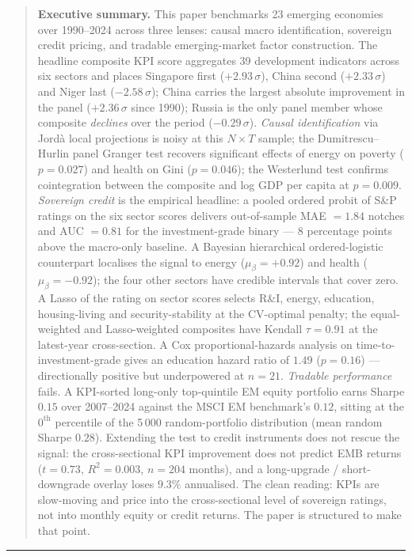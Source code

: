 \begin{quote}\small
\noindent\textbf{Executive summary.} This paper benchmarks 23 emerging economies over 1990--2024 across three lenses: causal macro identification, sovereign credit pricing, and tradable emerging-market factor construction. The headline composite KPI score aggregates 39 development indicators across six sectors and places Singapore first ($+2.93\,\sigma$), China second ($+2.33\,\sigma$) and Niger last ($-2.58\,\sigma$); China carries the largest absolute improvement in the panel ($+2.36\,\sigma$ since 1990); Russia is the only panel member whose composite \emph{declines} over the period ($-0.29\,\sigma$). \emph{Causal identification} via Jord\`a local projections is noisy at this $N \times T$ sample; the Dumitrescu--Hurlin panel Granger test recovers significant effects of energy on poverty ($p = 0.027$) and health on Gini ($p = 0.046$); the Westerlund test confirms cointegration between the composite and log GDP per capita at $p = 0.009$. \emph{Sovereign credit} is the empirical headline: a pooled ordered probit of S\&P ratings on the six sector scores delivers out-of-sample MAE $= 1.84$ notches and AUC $= 0.81$ for the investment-grade binary --- $8$ percentage points above the macro-only baseline. A Bayesian hierarchical ordered-logistic counterpart localises the signal to energy ($\mu_\beta = +0.92$) and health ($\mu_\beta = -0.92$); the four other sectors have credible intervals that cover zero. A Lasso of the rating on sector scores selects R\&I, energy, education, housing-living and security-stability at the CV-optimal penalty; the equal-weighted and Lasso-weighted composites have Kendall $\tau = 0.91$ at the latest-year cross-section. A Cox proportional-hazards analysis on time-to-investment-grade gives an education hazard ratio of $1.49$ ($p = 0.16$) --- directionally positive but underpowered at $n = 21$. \emph{Tradable performance} fails. A KPI-sorted long-only top-quintile EM equity portfolio earns Sharpe $0.15$ over 2007--2024 against the MSCI EM benchmark's $0.12$, sitting at the $0^{\text{th}}$ percentile of the 5\,000 random-portfolio distribution (mean random Sharpe $0.28$). Extending the test to credit instruments does not rescue the signal: the cross-sectional KPI improvement does not predict EMB returns ($t = 0.73$, $R^2 = 0.003$, $n = 204$ months), and a long-upgrade / short-downgrade overlay loses $9.3\%$ annualised. The clean reading: KPIs are slow-moving and price into the cross-sectional level of sovereign ratings, not into monthly equity or credit returns. The paper is structured to make that point.
\end{quote}

\vspace{0.6em}\hrule\vspace{1.0em}
